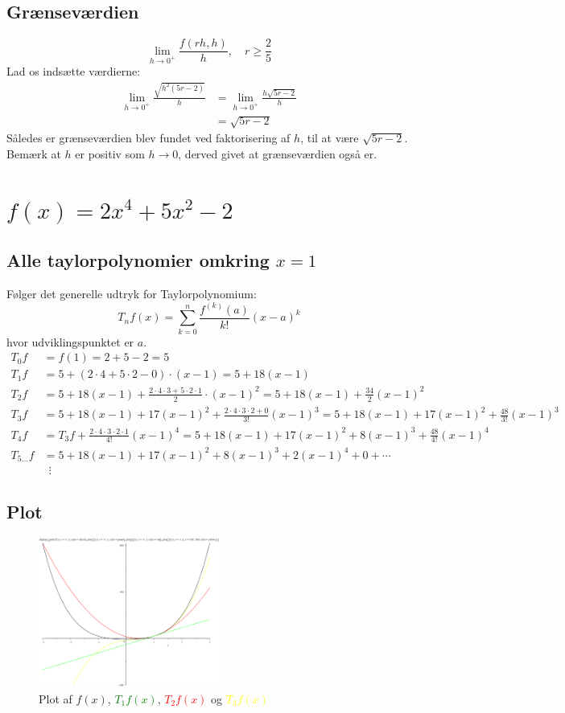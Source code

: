 \documentclass{report}
\begin{document}
\subsection{Grænseværdien}
$$\lim_{h\to0^+}\frac{f(rh,h)}{h},\quad r\geq\frac{2}{5}$$
Lad os indsætte værdierne:
\begin{align*}
    \lim_{h\to0^+}\frac{\sqrt{h^2(5r-2)}}{h}&=\lim_{h\to0^+}\frac{h\sqrt{5r-2}}{h}\\&=\sqrt{5r-2}
\end{align*}
Således er grænseværdien blev fundet ved faktorisering af $h$, til at være $\sqrt{5r-2}$. Bemærk at $h$ er positiv som $h\to0$, derved givet at grænseværdien også er.
\section{$f(x)=2x^4+5x^2-2$}
\subsection{Alle taylorpolynomier omkring $x=1$}
Følger det generelle udtryk for Taylorpolynomium:\begin{equation}
    T_nf(x)=\sum^n_{k=0}\frac{f^{(k)}(a)}{k!}(x-a)^k
\end{equation}{hvor udviklingspunktet er $a$.}
\begin{align*}
    T_0f&=f(1)=2+5-2=5\\
    T_1f&=5+(2\cdot4+5\cdot2-0)\cdot(x-1)=5+18(x-1)\\
    T_2f&=5+18(x-1)+\frac{2\cdot4\cdot3+5\cdot2\cdot1}{2}\cdot(x-1)^2=5+18(x-1)+\frac{34}{2}(x-1)^2\\
    T_3f&=5+18(x-1)+17(x-1)^2+\frac{2\cdot4\cdot3\cdot2+0}{3!}(x-1)^3=5+18(x-1)+17(x-1)^2+\frac{48}{3!}(x-1)^3\\
    T_4f&=T_3f+\frac{2\cdot4\cdot3\cdot2\cdot1}{4!}(x-1)^4=5+18(x-1)+17(x-1)^2+8(x-1)^3+\frac{48}{4!}(x-1)^4\\T_{5\ldots}f&=5+18(x-1)+17(x-1)^2+8(x-1)^3+2(x-1)^4+0+\cdots\\
    &\,\,\,\vdots
\end{align*}
\subsection{Plot}
\begin{figure}[H]
    \centering
    \includegraphics[width=0.53\textwidth]{32b.png}
    \caption{Plot af $f(x)$, \textcolor{green}{$T_1f(x)$}, \textcolor{red}{$T_2f(x)$} og \textcolor{yellow}{$T_3f(x)$}}
\end{figure}{}
\end{document}
